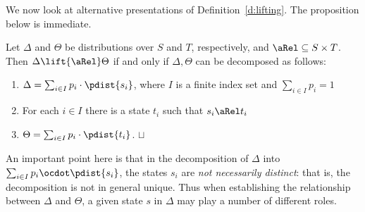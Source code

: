 \documentclass{article}
\def\squareforqed{\hbox{\rlap{$\sqcap$}$\sqcup$}}
\def\qed{\ifmmode\squareforqed\else{\unskip\nobreak\hfil
\penalty50\hskip1em\null\nobreak\hfil\squareforqed
\parfillskip=0pt\finalhyphendemerits=0\endgraf}\fi}
\begin{document}
We now look at alternative presentations of
Definition~\ref{d:lifting}. The proposition below is immediate.
\begin{proposition}\label{p:lifting}
Let $\Delta$ and $\Theta$ be distributions over $S$ and $T$,
  respectively, and $\aRel\subseteq S\times T$. Then
$\Delta \lift{\aRel} \Theta$ if and only if $\Delta,\Theta$ can be
decomposed as follows:
\begin{enumerate}
\item
$\Delta = \sum_{i\in I}{p_i \cdot \pdist{s_i}}$, where
  $I$ is a finite index set and  $\sum_{i\in I}{p_i} = 1$

\item
For each $i \in I$ there is a state $t_i$ such that $s_i \aRel t_i$

\item
$\Theta = \sum_{i \in I} {p_i \cdot \pdist{t_i}}$. \hfill\qed
\end{enumerate}
\end{proposition}

An important point here is that in the decomposition of $\Delta$
into $\sum_{i\in I}{p_i \ocdot \pdist{s_i}}$, the states $s_i$ are
\emph{not necessarily distinct}: that is, the decomposition is not
in general unique. Thus when establishing the relationship between
$\Delta$ and $\Theta$, a given state $s$ in $\Delta$ may play a
number of different roles.
\end{document}
